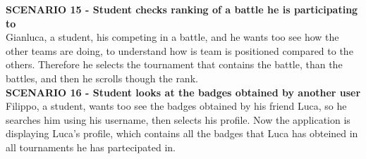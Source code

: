     \textbf{SCENARIO 15 - Student checks ranking of a battle he is participating to}\\
    Gianluca, a student, his competing in a battle, and he wants too see how the other teams are doing, to understand how is team is positioned compared to the others. Therefore he selects the tournament that contains the battle, than the battles, and then he scrolls though the rank.\\

    \textbf{SCENARIO 16 - Student looks at the badges obtained by another user}\\
    Filippo, a student, wants too see the badges obtained by his friend Luca, so he searches him using his username, then selects his profile. Now the application is displaying Luca's profile, which contains all the badges that Luca has obteined in all tournaments he has partecipated in.